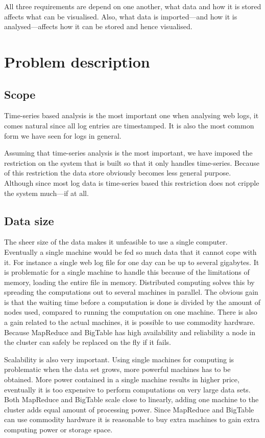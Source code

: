 \documentclass[a4paper,10pt]{book}
\begin{document}
All three requirements are depend on one another, what data and how it is
stored affects what can be visualised. Also, what data is imported---and
how it is analysed---affects how it can be stored and hence visualised.



\section{Problem description}

\subsection{Scope}

Time-series based analysis is the most important one when analysing web
logs, it comes natural since all log entries are timestamped.
\cite{discoveringweb} It is also the most common form we have seen for logs
in general.

Assuming that time-series analysis is the most important, we have imposed
the restriction on the system that is built so that it only handles
time-series. Because of this restriction the data store obviously becomes
less general purpose. Although since most log data is time-series based
this restriction does not cripple the system much---if at all.



\subsection{Data size}

The sheer size of the data makes it unfeasible to use a single computer.
Eventually a single machine would be fed so much data that it cannot cope
with it. For instance a single web log file for one day can be up to
several gigabytes. It is problematic for a single machine to handle this
because of the limitations of memory, loading the entire file in memory.
Distributed computing solves this by spreading the computations out to
several machines in parallel. The obvious gain is that the waiting time
before a computation is done is divided by the amount of nodes used,
compared to running the computation on one machine. There is also a gain
related to the actual machines, it is possible to use commodity hardware.
Because MapReduce and BigTable has high availability and reliability a node
in the cluster can safely be replaced on the fly if it fails.

Scalability is also very important. Using single machines for computing is
problematic when the data set grows, more powerful machines has to be
obtained. More power contained in a single machine results in higher price,
eventually it is too expensive to perform computations on very large
data sets. Both MapReduce and BigTable scale close to linearly, adding one
machine to the cluster adds equal amount of processing power. Since
MapReduce and BigTable can use commodity hardware it is reasonable to buy
extra machines to gain extra computing power or storage space.
\end{document}
